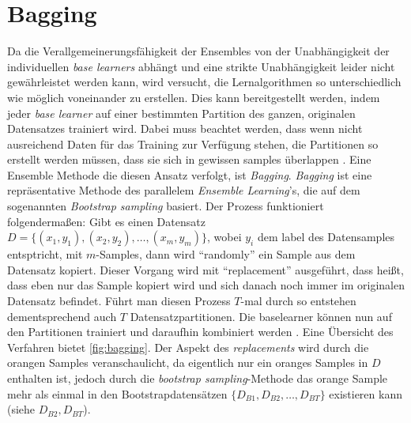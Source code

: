 \section{Bagging}
Da die Verallgemeinerungsfähigkeit der Ensembles von der Unabhängigkeit der individuellen \textit{base learners} abhängt und eine strikte Unabhängigkeit leider nicht gewährleistet werden kann, wird versucht, die Lernalgorithmen so unterschiedlich wie möglich voneinander zu erstellen. Dies kann  bereitgestellt werden, indem jeder \textit{base learner} auf einer bestimmten Partition des ganzen, originalen Datensatzes trainiert wird. Dabei muss beachtet werden, dass wenn nicht ausreichend Daten für das Training zur Verfügung stehen, die Partitionen so erstellt werden müssen, dass sie sich in gewissen \glspl{sample} überlappen \autocite[vgl. S.189]{Zhou.2021}. Eine Ensemble Methode die diesen Ansatz verfolgt, ist \textit{Bagging}\autocite[]{Breiman.1996}. \textit{Bagging} ist eine repräsentative Methode des parallelem \textit{Ensemble Learning}'s, die auf dem sogenannten \textit{Bootstrap sampling} basiert. Der Prozess funktioniert folgendermaßen: Gibt es einen Datensatz $D = \{(x_1,y_1), (x_2,y_2), \dots, (x_m,y_m)\}$, wobei $y_i$ dem \gls{label} des Datensamples entsptricht, mit $m$-Samples, dann wird \enquote{randomly}\autocite[S.190]{Zhou.2021} ein Sample aus dem Datensatz kopiert. Dieser Vorgang wird mit \enquote{replacement}\autocite[S.1]{Breiman.1996} ausgeführt, dass heißt, dass eben nur das Sample kopiert wird und sich danach noch immer im originalen Datensatz befindet. Führt man diesen Prozess $T$-mal durch so entstehen dementsprechend auch $T$ Datensatzpartitionen. Die \gls{baselearner} können nun auf den Partitionen trainiert und daraufhin kombiniert werden \autocite[vgl. S.190]{Zhou.2021}.
Eine Übersicht des Verfahren bietet \autoref{fig:bagging}. Der Aspekt des \textit{replacements} wird durch die orangen Samples veranschaulicht, da eigentlich nur ein oranges Samples in $D$ enthalten ist, jedoch durch die \textit{bootstrap sampling}-Methode das orange Sample mehr als einmal in den Bootstrapdatensätzen $\{{D_{B1}, D_{B2}, \dots, D_{BT}\}}$ existieren kann (siehe $D_{B2}, D_{BT}$).

\vspace{4ex}

